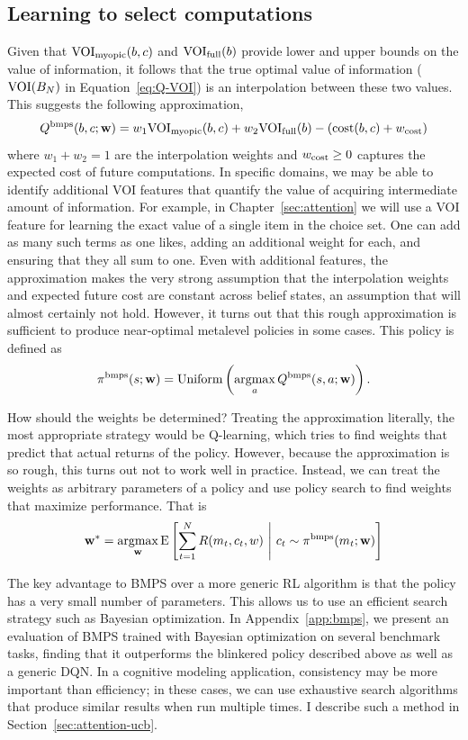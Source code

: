\subsection{Learning to select computations}

Given that $\text{VOI}_\text{myopic}(b,c)$ and $\text{VOI}_\text{full}(b)$ provide lower and upper bounds on the value of information, it follows that the true optimal value of information ($\text{VOI}(B_N)$ in Equation~\ref{eq:Q-VOI}) is an interpolation between these two values. This suggests the following approximation,
\begin{equation}\label{eq:bmpsQ}
  Q^{\mathrm{bmps}}(b, c; \mathbf{w}) = w_1 \text{VOI}_\text{myopic}(b,c) + w_2 \text{VOI}_\text{full}(b) - (\text{cost}(b, c) + w_{\text{cost}})
\end{equation}
where $w_1 + w_2 = 1$ are the interpolation weights and $w_{\text{cost}} \geq 0$ captures the expected cost of future computations. In specific domains, we may be able to identify additional VOI features that quantify the value of acquiring intermediate amount of information. For example, in Chapter~\ref{sec:attention} we will use a VOI feature for learning the exact value of a single item in the choice set. One can add as many such terms as one likes, adding an additional weight for each, and ensuring that they all sum to one. Even with additional features, the approximation makes the very strong assumption that the interpolation weights and expected future cost are constant across belief states, an assumption that will almost certainly not hold. However, it turns out that this rough approximation is sufficient to produce near-optimal metalevel policies in some cases. This policy is defined as
\begin{equation}
  \pi^{\mathrm{bmps}}(s; \mathbf{w}) = \mathrm{Uniform}\left(\operatorname*{argmax}_a Q^{\mathrm{bmps}}(s, a; \mathbf{w})\right).
\end{equation}

How should the weights be determined? Treating the approximation literally, the most appropriate strategy would be Q-learning, which tries to find weights that predict that actual returns of the policy. However, because the approximation is so rough, this turns out not to work well in practice. Instead, we can treat the weights as arbitrary parameters of a policy and use policy search to find weights that maximize performance. That is
\begin{equation}
  \mathbf{w}^* = \operatorname*{argmax}_{\mathbf{w}} \operatorname*{E} \left[ 
    \sum_{t=1}^{N} R(m_t, c_t, w)
   \ \middle\vert\ 
    c_t \sim \pi^{\mathrm{bmps}}(m_t; \mathbf{w})
   \right]
\end{equation}

The key advantage to BMPS over a more generic RL algorithm is that the policy has a very small number of parameters. This allows us to use an efficient search strategy such as Bayesian optimization. In Appendix~\ref{app:bmps}, we present an evaluation of BMPS trained with Bayesian optimization on several benchmark tasks, finding that it outperforms the blinkered policy described above as well as a generic DQN. In a cognitive modeling application, consistency may be more important than efficiency; in these cases, we can use exhaustive search algorithms that produce similar results when run multiple times. I describe such a method in Section~\ref{sec:attention-ucb}.
